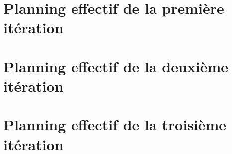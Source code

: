 \documentclass[a4paper,10pt]{article}
\begin{document}
\FloatBarrier
\section{Planning effectif de la première itération}
  
  
\FloatBarrier
\section{Planning effectif de la deuxième itération}
  
  
\FloatBarrier
\section{Planning effectif de la troisième itération}
  
\end{document}
